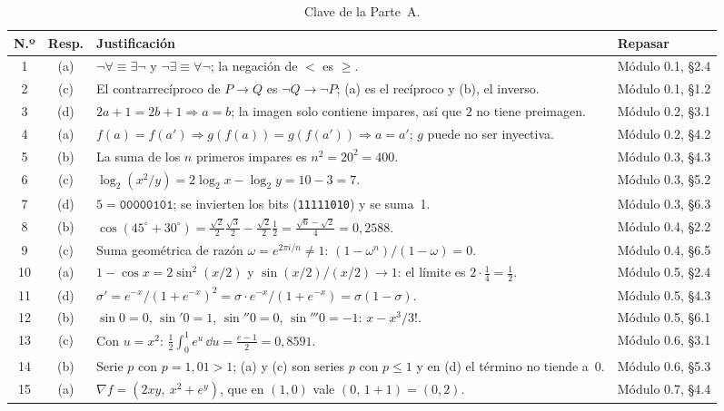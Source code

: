 \begin{table}[h]
\centering\footnotesize
\caption{Clave de la Parte~A.}\label{tab:clave}
\begin{tabularx}{\textwidth}{@{}c c >{\raggedright\arraybackslash}X l@{}}
\toprule
N.º & Resp. & Justificación & Repasar \\
\midrule
1 & (a) & $\neg\forall\equiv\exists\neg$ y $\neg\exists\equiv\forall\neg$; la negación de $<$ es $\ge$. & Módulo 0.1, §2.4 \\
2 & (c) & El contrarrecíproco de $P\to Q$ es $\neg Q\to\neg P$; (a) es el recíproco y (b), el inverso. & Módulo 0.1, §1.2 \\
3 & (d) & $2a+1=2b+1\Rightarrow a=b$; la imagen solo contiene impares, así que $2$ no tiene preimagen. & Módulo 0.2, §3.1 \\
4 & (a) & $f(a)=f(a')\Rightarrow g(f(a))=g(f(a'))\Rightarrow a=a'$; $g$ puede no ser inyectiva. & Módulo 0.2, §4.2 \\
5 & (b) & La suma de los $n$ primeros impares es $n^{2}=20^{2}=400$. & Módulo 0.3, §4.3 \\
6 & (c) & $\log_2(x^{2}/y)=2\log_2x-\log_2y=10-3=7$. & Módulo 0.3, §5.2 \\
7 & (d) & $5=\texttt{00000101}$; se invierten los bits (\texttt{11111010}) y se suma~1. & Módulo 0.3, §6.3 \\
8 & (b) & $\cos(45^{\circ}+30^{\circ})=\frac{\sqrt2}{2}\frac{\sqrt3}{2}-\frac{\sqrt2}{2}\frac12=\frac{\sqrt6-\sqrt2}{4}=0{,}2588$. & Módulo 0.4, §2.2 \\
9 & (c) & Suma geométrica de razón $\omega=e^{2\pi i/n}\neq1$: $(1-\omega^{n})/(1-\omega)=0$. & Módulo 0.4, §6.5 \\
10 & (a) & $1-\cos x=2\sin^{2}(x/2)$ y $\sin(x/2)/(x/2)\to1$: el límite es $2\cdot\frac14=\frac12$. & Módulo 0.5, §2.4 \\
11 & (d) & $\sigma'=e^{-x}/(1+e^{-x})^{2}=\sigma\cdot e^{-x}/(1+e^{-x})=\sigma(1-\sigma)$. & Módulo 0.5, §4.3 \\
12 & (b) & $\sin0=0$, $\sin'0=1$, $\sin''0=0$, $\sin'''0=-1$: $x-x^{3}/3!$. & Módulo 0.5, §6.1 \\
13 & (c) & Con $u=x^{2}$: $\frac12\int_0^1e^{u}\,\dd u=\frac{e-1}{2}=0{,}8591$. & Módulo 0.6, §3.1 \\
14 & (b) & Serie $p$ con $p=1{,}01>1$; (a) y (c) son series $p$ con $p\le1$ y en (d) el término no tiende a~0. & Módulo 0.6, §5.3 \\
15 & (a) & $\nabla f=(2xy,\ x^{2}+e^{y})$, que en $(1,0)$ vale $(0,\,1+1)=(0,2)$. & Módulo 0.7, §4.4 \\

\end{tabularx}
\end{table}
